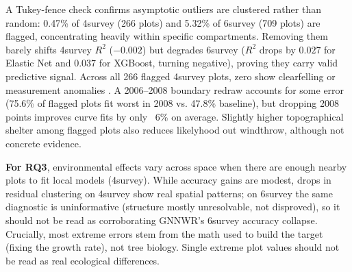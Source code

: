 A Tukey-fence check confirms asymptotic outliers are clustered rather than random: 0.47\% of 4survey (266 plots) and 5.32\% of 6survey (709 plots) are flagged, concentrating heavily within specific compartments. Removing them barely shifts 4survey $R^2$ ($-0.002$) but degrades 6survey ($R^2$ drops by $0.027$ for Elastic Net and $0.037$ for XGBoost, turning negative), proving they carry valid predictive signal. Across all 266 flagged 4survey plots, zero show clearfelling or measurement anomalies . A 2006–2008 boundary redraw accounts for some error (75.6\% of flagged plots fit worst in 2008 vs. 47.8\% baseline), but dropping 2008 points improves curve fits by only ~6\% on average. Slightly higher topographical shelter among flagged plots also reduces likelyhood out windthrow, although not concrete evidence. 

\textbf{For RQ3}, environmental effects vary across space when there are enough nearby plots to fit local models (4survey). While accuracy gains are modest, drops in residual clustering on 4survey show real spatial patterns; on 6survey the same diagnostic is uninformative (structure mostly unresolvable, not disproved), so it should not be read as corroborating GNNWR's 6survey accuracy collapse. Crucially, most extreme errors stem from the math used to build the target (fixing the growth rate), not tree biology. Single extreme plot values should not be read as real ecological differences. 




















